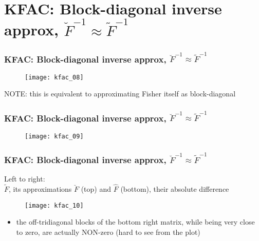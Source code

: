 \section{KFAC: Block-diagonal inverse approx, $\breve{F}^{-1} \approx \tilde{F}^{-1}$}

\begin{frame}
\frametitle{KFAC: Block-diagonal inverse approx, $\breve{F}^{-1} \approx \tilde{F}^{-1}$}
\begin{figure}
    \centering
    \texttt{[image: kfac\_08]}
\end{figure}
NOTE: this is equivalent to approximating Fisher itself as block-diagonal
\end{frame}

\begin{frame}
\frametitle{KFAC: Block-diagonal inverse approx, $\breve{F}^{-1} \approx \tilde{F}^{-1}$}
\begin{figure}
    \centering
    \texttt{[image: kfac\_09]}
\end{figure}
\end{frame}

\begin{frame}
\frametitle{KFAC: Block-diagonal inverse approx, $\breve{F}^{-1} \approx \tilde{F}^{-1}$}
Left to right: \\
$\tilde{F}$, its approximations $\breve{F}$ (top) and $\hat{F}$ (bottom), their absolute difference

\begin{figure}
    \centering
    \texttt{[image: kfac\_10]}
\end{figure}

\begin{itemize}
    \item the off-tridiagonal blocks of the bottom right matrix, while being very close to zero, are
    actually NON-zero (hard to see from the plot)
\end{itemize}


\end{frame}
